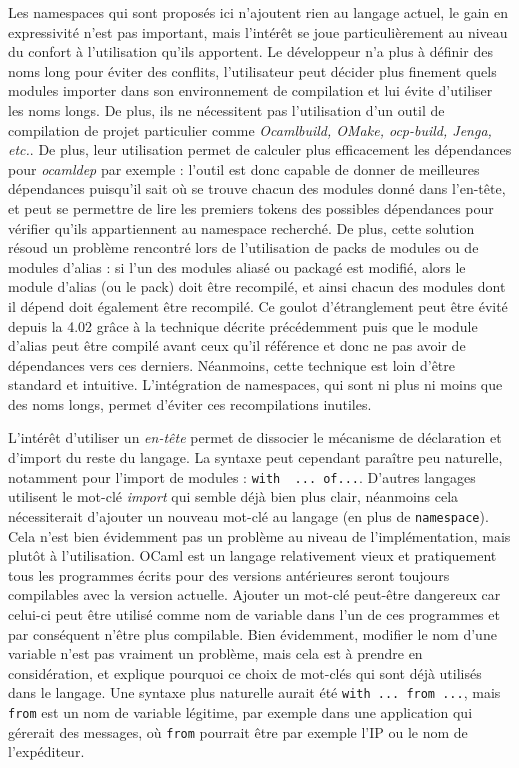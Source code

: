 \documentclass[11pt,a4paper]{report}
\begin{document}
Les namespaces qui sont proposés ici n'ajoutent rien au langage actuel, le gain
en expressivité n'est pas important, mais l'intérêt se joue particulièrement au
niveau du confort à l'utilisation qu'ils apportent. Le développeur n'a plus à
définir des noms long pour éviter des conflits, l'utilisateur peut décider plus
finement quels modules importer dans son environnement de compilation et lui
évite d'utiliser les noms longs. De plus, ils ne nécessitent pas l'utilisation
d'un outil de compilation de projet particulier comme \emph{Ocamlbuild, OMake,
  ocp-build, Jenga, etc.}. De plus, leur utilisation permet de calculer plus
efficacement les dépendances pour \emph{ocamldep} par exemple : l'outil est donc
capable de donner de meilleures dépendances puisqu'il sait où se trouve chacun
des modules donné dans l'en-tête, et peut se permettre de lire les premiers
tokens des possibles dépendances pour vérifier qu'ils appartiennent au namespace
recherché. De plus, cette solution résoud un problème rencontré lors de
l'utilisation de packs de modules ou de modules d'alias : si l'un des modules
aliasé ou packagé est modifié, alors le module d'alias (ou le pack) doit être
recompilé, et ainsi chacun des modules dont il dépend doit également être
recompilé. Ce goulot d'étranglement peut être évité depuis la 4.02 grâce à la
technique décrite précédemment puis que le module d'alias peut être compilé
avant ceux qu'il référence et donc ne pas avoir de dépendances vers ces
derniers. Néanmoins, cette technique est loin d'être standard et
intuitive. L'intégration de namespaces, qui sont ni plus ni moins que des noms
longs, permet d'éviter ces recompilations inutiles.

L'intérêt d'utiliser un \emph{en-tête} permet de dissocier le mécanisme de
déclaration et d'import du reste du langage. La syntaxe peut cependant paraître
peu naturelle, notamment pour l'import de modules : 
\lstinline{with  ... of...}. 
D'autres langages utilisent le mot-clé \emph{import} qui semble
déjà bien plus clair, néanmoins cela nécessiterait d'ajouter un nouveau mot-clé
au langage (en plus de \texttt{namespace}). Cela n'est bien évidemment pas un
problème au niveau de l'implémentation, mais plutôt à l'utilisation. OCaml est
un langage relativement vieux et pratiquement tous les programmes écrits pour
des versions antérieures seront toujours compilables avec la version
actuelle. Ajouter un mot-clé peut-être dangereux car celui-ci peut être utilisé
comme nom de variable dans l'un de ces programmes et par conséquent n'être plus
compilable. Bien évidemment, modifier le nom d'une variable n'est pas vraiment
un problème, mais cela est à prendre en considération, et explique pourquoi ce
choix de mot-clés qui sont déjà utilisés dans le langage. Une syntaxe plus
naturelle aurait été \texttt{with ... from ...}, mais \texttt{from} est un nom
de variable légitime, par exemple dans une application qui gérerait des
messages, où \texttt{from} pourrait être par exemple l'IP ou le nom de
l'expéditeur.
\end{document}
